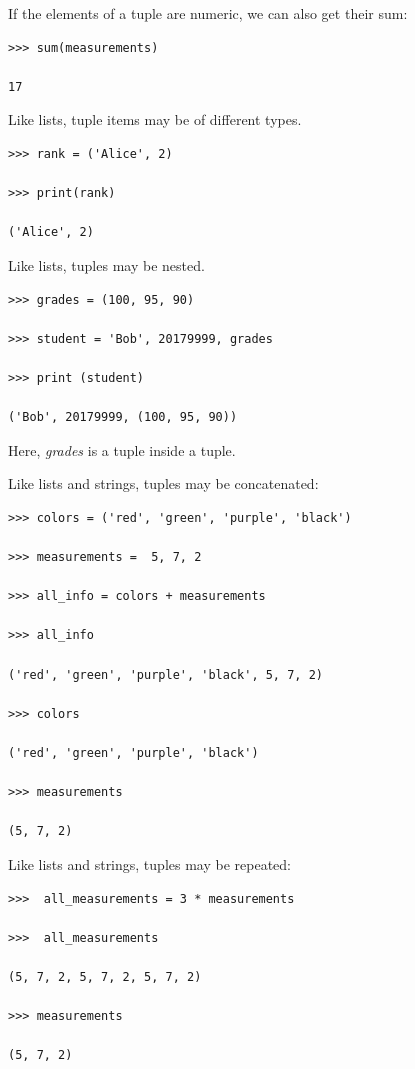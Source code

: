 \documentclass{article}
\begin{document}
If the elements of a tuple are numeric, we can also get their sum:

\begin{lstlisting}
>>> sum(measurements)

17
\end{lstlisting}

Like lists, tuple items may be of different types.

\begin{lstlisting}
>>> rank = ('Alice', 2)

>>> print(rank)

('Alice', 2)
\end{lstlisting}

Like lists, tuples may be nested.

\begin{lstlisting}
>>> grades = (100, 95, 90)

>>> student = 'Bob', 20179999, grades

>>> print (student)

('Bob', 20179999, (100, 95, 90)) 
\end{lstlisting}

Here, \textit{grades} is a tuple inside a tuple.

Like lists and strings, tuples may be concatenated:

\begin{lstlisting}
>>> colors = ('red', 'green', 'purple', 'black')

>>> measurements =  5, 7, 2

>>> all_info = colors + measurements

>>> all_info

('red', 'green', 'purple', 'black', 5, 7, 2)

>>> colors

('red', 'green', 'purple', 'black')

>>> measurements

(5, 7, 2)
\end{lstlisting}

Like lists and strings, tuples may be repeated:

\begin{lstlisting}
>>>  all_measurements = 3 * measurements

>>>  all_measurements 

(5, 7, 2, 5, 7, 2, 5, 7, 2)

>>> measurements

(5, 7, 2)
\end{lstlisting}
\end{document}
